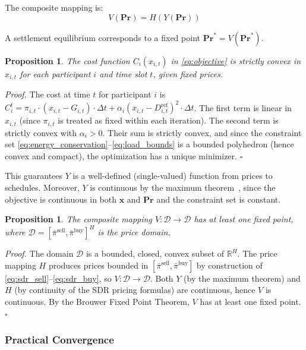 \documentclass[pdflatex,sn-mathphys-num]{sn-jnl}
\theoremstyle{thmstyleone}
\newtheorem{proposition}[theorem]{Proposition}
\theoremstyle{thmstyletwo}
\begin{document}
The composite mapping is:
\begin{equation}
    V(\mathbf{Pr}) = H(Y(\mathbf{Pr}))
    \label{eq:fixed_point}
\end{equation}

A settlement equilibrium corresponds to a fixed point $\mathbf{Pr}^* = V(\mathbf{Pr}^*)$.

\begin{proposition}\label{prop:convex}
The cost function $C_i(x_{i,t})$ in \eqref{eq:objective} is strictly convex in $x_{i,t}$ for each participant $i$ and time slot $t$, given fixed prices.
\end{proposition}

\textit{Proof.} The cost at time $t$ for participant $i$ is $C_i^t = \pi_{i,t} \cdot (x_{i,t} - G_{i,t}) \cdot \Delta t + \alpha_i(x_{i,t} - D_{i,t}^{\text{ref}})^2 \cdot \Delta t$. The first term is linear in $x_{i,t}$ (since $\pi_{i,t}$ is treated as fixed within each iteration). The second term is strictly convex with $\alpha_i > 0$. Their sum is strictly convex, and since the constraint set \eqref{eq:energy_conservation}--\eqref{eq:load_bounds} is a bounded polyhedron (hence convex and compact), the optimization has a unique minimizer. \hfill$\square$

This guarantees $Y$ is a well-defined (single-valued) function from prices to schedules. Moreover, $Y$ is continuous by the maximum theorem~\cite{berge1963}, since the objective is continuous in both $\mathbf{x}$ and $\mathbf{Pr}$ and the constraint set is constant.

\begin{proposition}\label{prop:fixed_point}
The composite mapping $V: \mathcal{D} \to \mathcal{D}$ has at least one fixed point, where $\mathcal{D} = [\bar{\pi}^{\text{sell}}, \bar{\pi}^{\text{buy}}]^H$ is the price domain.
\end{proposition}

\textit{Proof.} The domain $\mathcal{D}$ is a bounded, closed, convex subset of $\mathbb{R}^H$. The price mapping $H$ produces prices bounded in $[\bar{\pi}^{\text{sell}}, \bar{\pi}^{\text{buy}}]$ by construction of \eqref{eq:sdr_sell}--\eqref{eq:sdr_buy}, so $V: \mathcal{D} \to \mathcal{D}$. Both $Y$ (by the maximum theorem) and $H$ (by continuity of the SDR pricing formulas) are continuous, hence $V$ is continuous. By the Brouwer Fixed Point Theorem, $V$ has at least one fixed point. \hfill$\square$

\subsubsection{Practical Convergence}
\end{document}
